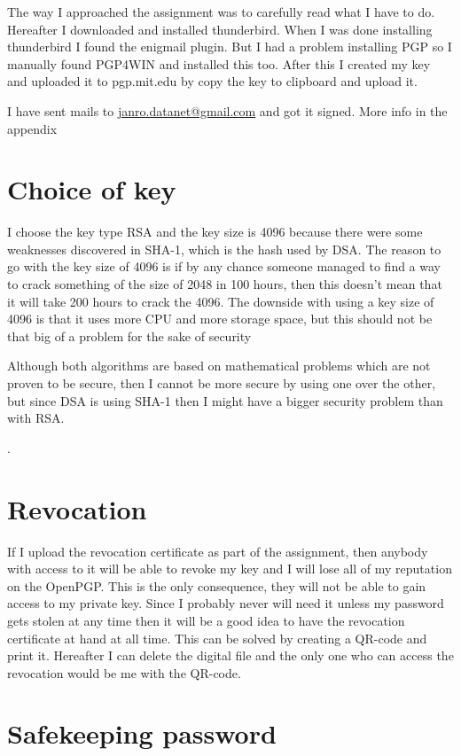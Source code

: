 \documentclass{sig-alternate-05-2015}
\begin{document}
The way I approached the assignment was to carefully read what I have to do. Hereafter I downloaded and installed thunderbird. When I was done installing thunderbird I found the enigmail plugin. But I had a problem installing PGP so I manually found PGP4WIN and installed this too. After this I created my key and uploaded it to pgp.mit.edu by copy the key to clipboard and upload it.

I have sent mails to \href{janro.datanet@gmail.com}{janro.datanet@gmail.com} and got it signed. More info in the appendix

\section{Choice of key}

I choose the key type RSA and the key size is 4096 because there were some weaknesses discovered in SHA-1, which is the hash used by DSA. The reason to go with the key size of 4096 is if by any chance someone managed to find a way to crack something of the size of 2048 in 100 hours, then this doesn't mean that it will take 200 hours to crack the 4096. The downside with using a key size of 4096 is that it uses more CPU and more storage space, but this should not be that big of a problem for the sake of security

Although both algorithms are based on mathematical problems which are not proven to be secure, then I cannot be more secure by using one over the other, but since DSA is using SHA-1 then I might have a bigger security problem than with RSA.

.
\section{Revocation}

If I upload the revocation certificate as part of the assignment, then anybody with access to it will be able to revoke my key and I will lose all of my reputation on the OpenPGP. This is the only consequence, they will not be able to gain access to my private key.
Since I probably never will need it unless my password gets stolen at any time then it will be a good idea to have the revocation certificate at hand at all time. This can be solved by creating a QR-code and print it. Hereafter I can delete the digital file and the only one who can access the revocation would be me with the QR-code.

\section{Safekeeping password}
\end{document}
